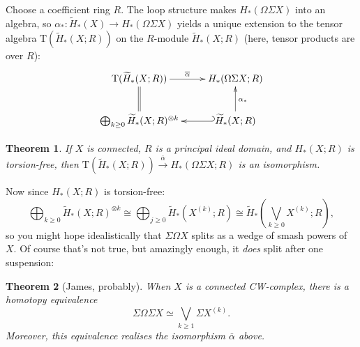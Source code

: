 \documentclass{article}
\newcommand{\Suspend}{\Sigma}
\newcommand{\Loops}{\Omega}
\renewcommand{\to}{\longrightarrow}
\newtheorem{thm}{Theorem}[section]
\theoremstyle{definition}
\begin{document}
Choose a coefficient ring $R$.
The loop structure makes $H_* (\Loops \Suspend X)$ into an algebra, so $\alpha_*: \widetilde H_*(X) \to H_* (\Loops \Suspend X)$ yields a unique extension to the tensor algebra $\mathrm{T}(\widetilde H_*(X;R))$ on the $R$-module $\widetilde H_*(X;R)$ (here, tensor products are over $R$):
\[\xymatrix{
\mathrm{T}(\widetilde H_*(X;R))\ar[r]^{\overline\alpha}&H_*(\Omega\Sigma X;R)\\
\ar@{=}[u]\bigoplus_{k\geq0}\widetilde H_*(X;R)^{\otimes k}&
\widetilde H_*(X;R)\ar@{_{(}->}[l]\ar[u]_{\alpha_*}
}\]
\begin{thm}
If $X$ is connected, $R$ is a principal ideal domain, and $H_*(X; R)$ is torsion-free, then $\mathrm{T} (\widetilde H_*(X; R)) \stackrel{\overline \alpha}{\to} H_*(\Loops \Suspend X; R)$ is an isomorphism.
\end{thm}
Now since $H_*(X; R)$ is torsion-free:
\[\bigoplus_{k \ge 0} \widetilde H_*(X;R)^{\otimes k} \cong \bigoplus_{j \ge 0} \widetilde H_* (X^{(k)};R) \cong \widetilde H_*{\left(\textstyle\bigvee_{k \ge 0} X^{(k)};R\right)},\]
so you might hope idealistically that $\Suspend \Loops X$ splits as a wedge of smash powers of $X$.  Of course that's not true, but amazingly enough, it \emph{does} split after one suspension:
\begin{thm}[James, probably]
When $X$ is a connected CW-complex, there is a homotopy equivalence
\[
\Suspend \Loops \Suspend X \simeq \bigvee_{k \ge 1} \Suspend X^{(k)}
.\]
Moreover, this equivalence realises the isomorphism $\overline\alpha$ above.
\end{thm}
\end{document}
